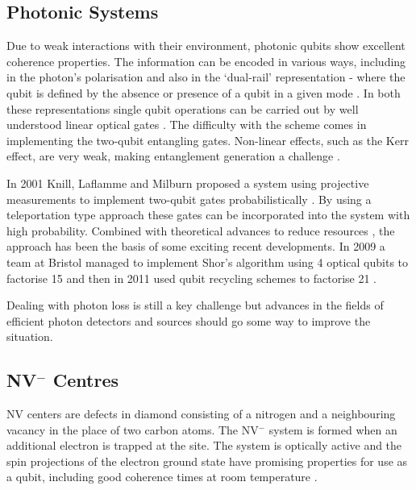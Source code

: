 \subsection{Photonic Systems}

Due to weak interactions with their environment, photonic qubits show excellent coherence properties. The information can be encoded in various ways, including in the photon's polarisation and also in the `dual-rail' representation - where the qubit is defined by the absence or presence of a qubit in a given mode \cite{loqc_review_07}. In both these representations single qubit operations can be carried out by well understood linear optical gates \cite{fox_quantum_optics, walls+milburn}. The difficulty with the scheme comes in implementing the two-qubit entangling gates. Non-linear effects, such as the Kerr effect, are very weak, making entanglement generation a challenge \cite{kerr_too_weak_06}.

In 2001 Knill, Laflamme and Milburn proposed a system using projective measurements to implement two-qubit gates probabilistically \cite{klm}. By using a teleportation type approach these gates can be incorporated into the system with high probability. Combined with theoretical advances to reduce resources \cite{science_loqc_review}, the approach has been the basis of some exciting recent developments. In 2009 a team at Bristol managed to implement Shor's algorithm using 4 optical qubits to factorise 15 \cite{shor_chip_bristol} and then in 2011 used qubit recycling schemes to factorise 21 \cite{shor_chip_bristol_2}.  

Dealing with photon loss is still a key challenge but advances in the fields of efficient photon detectors \cite{single_photon_detector_review_09} and sources \cite{single_photon_source_review_04} should go some way to improve the situation.

\subsection{NV$^{-}$ Centres}

NV centers are defects in diamond consisting of a nitrogen and a neighbouring vacancy in the place of two carbon atoms. The NV$^{-}$ system is formed when an additional electron is trapped at the site. The system is optically active and the spin projections of the electron ground state have promising properties for use as a qubit, including good coherence times at room temperature \cite{nv_review, nv_oscillation_04}. 


